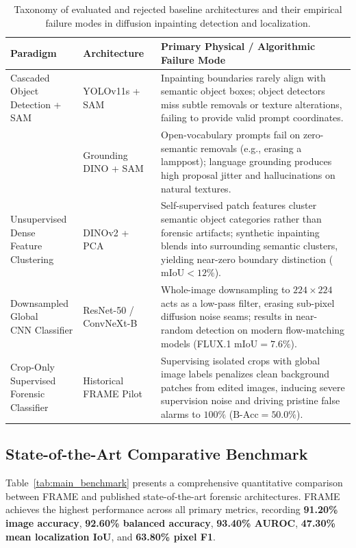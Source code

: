 \begin{table}[t]
\centering\small
\caption{Taxonomy of evaluated and rejected baseline architectures and their empirical failure modes in diffusion inpainting detection and localization.}
\label{tab:rejected_taxonomy}
\setlength{\tabcolsep}{3pt}
\renewcommand{\arraystretch}{1.12}
\begin{tabular}{@{}p{2.7cm}p{3.5cm}p{\dimexpr\textwidth-6.2cm-4\tabcolsep\relax}@{}}
\toprule
Paradigm & Architecture & Primary Physical / Algorithmic Failure Mode \\
\midrule
\shortstack[l]{Cascaded Object\\Detection + SAM} 
& YOLOv11s + SAM~\cite{yolo,sam} & Inpainting boundaries rarely align with semantic object boxes; object detectors miss subtle removals or texture alterations, failing to provide valid prompt coordinates. \\
\addlinespace[3pt]
& Grounding DINO + SAM~\cite{gdino,sam} & Open-vocabulary prompts fail on zero-semantic removals (e.g., erasing a lamppost); language grounding produces high proposal jitter and hallucinations on natural textures. \\
\midrule
\shortstack[l]{Unsupervised Dense\\Feature Clustering} 
& DINOv2 + PCA~\cite{dinov2} & Self-supervised patch features cluster semantic object categories rather than forensic artifacts; synthetic inpainting blends into surrounding semantic clusters, yielding near-zero boundary distinction ($\mathrm{mIoU} < 12\%$). \\
\midrule
\shortstack[l]{Downsampled Global\\CNN Classifier} 
& ResNet-50 / ConvNeXt-B~\cite{resnet,convnext} & Whole-image downsampling to $224 \times 224$ acts as a low-pass filter, erasing sub-pixel diffusion noise seams; results in near-random detection on modern flow-matching models (FLUX.1 $\mathrm{mIoU} = 7.6\%$). \\
\midrule
\shortstack[l]{Crop-Only Supervised\\Forensic Classifier} 
& Historical FRAME Pilot~\cite{trufor} & Supervising isolated crops with global image labels penalizes clean background patches from edited images, inducing severe supervision noise and driving pristine false alarms to $100\%$ ($\mathrm{B}\text{-}\mathrm{Acc} = 50.0\%$). \\
\bottomrule
\end{tabular}
\end{table}

\subsection{State-of-the-Art Comparative Benchmark}
Table~\ref{tab:main_benchmark} presents a comprehensive quantitative comparison between FRAME and published state-of-the-art forensic architectures. FRAME achieves the highest performance across all primary metrics, recording \textbf{91.20\% image accuracy}, \textbf{92.60\% balanced accuracy}, \textbf{93.40\% AUROC}, \textbf{47.30\% mean localization IoU}, and \textbf{63.80\% pixel F1}.

